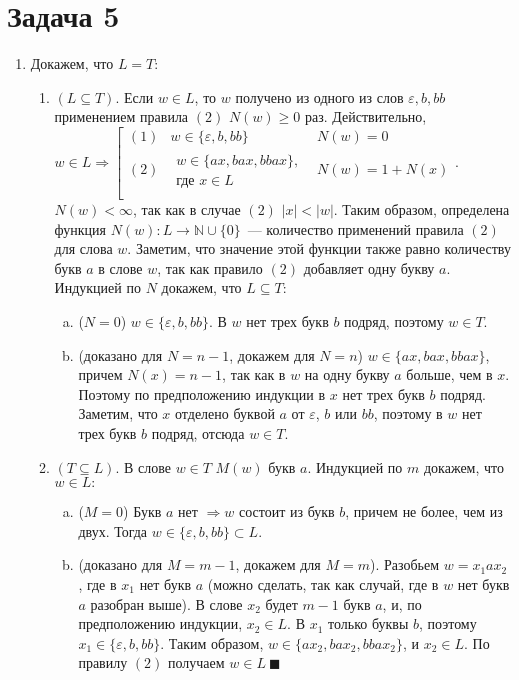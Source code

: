 \documentclass[a4paper]{article}
\begin{document}
\section*{Задача 5}
\begin{enumerate}[1.]
\item
Докажем, что $L=T$:
\begin{enumerate}[1.]
\item $(L\subseteq T)$. Если $w\in L$, то $w$ получено из одного из слов $\varepsilon,b,bb$ применением правила $(2)$ $N(w)\geqslant 0$ раз. Действительно, $w\in L\Rightarrow
\left[
\begin{array}{lll}
(1) & w\in\{\varepsilon,b,bb\} & N(w)=0\\
(2) & \substack{w\in\{ax,bax,bbax\},\\\text{где } x\in L} & N(w)=1+N(x)\\
\end{array}
\right.
$. $N(w)<\infty$, так как в случае $(2)$ $|x|<|w|$.\newline
Таким образом, определена функция $N(w):L\longrightarrow {\mathbb N}\cup\{0\}$~--- количество применений правила $(2)$ для слова $w$. Заметим, что значение этой функции также равно количеству букв $a$ в слове $w$, так как правило $(2)$ добавляет одну букву $a$. Индукцией по $N$ докажем, что $L\subseteq T$:
\begin{enumerate}[a.]
\item ($N=0$) $w\in \{\varepsilon,b,bb\}$. В $w$ нет трех букв $b$ подряд, поэтому $w\in T$.
\item (доказано для $N=n-1$, докажем для $N=n$) $w\in \{ax,bax,bbax\}$, причем $N(x)=n-1$, так как в $w$ на одну букву $a$ больше, чем в $x$. Поэтому по предположению индукции в $x$ нет трех букв $b$ подряд. Заметим, что $x$ отделено буквой $a$ от $\varepsilon$, $b$ или $bb$, поэтому в $w$ нет трех букв $b$ подряд, отсюда $w\in T$.
\end{enumerate}
\item $(T\subseteq L)$. В слове $w\in T$ $M(w)$ букв $a$. Индукцией по $m$ докажем, что $w\in L:$
\begin{enumerate}[a.]
\item ($M=0$) Букв $a$ нет $\Rightarrow w$ состоит из букв $b$, причем не более, чем из двух. Тогда $w\in \{\varepsilon,b,bb\}\subset L$.
\item (доказано для $M=m-1$, докажем для $M=m$). Разобьем $w=x_1ax_2$, где в $x_1$ нет букв $a$ (можно сделать, так как случай, где в $w$ нет букв $a$ разобран выше). В слове $x_2$ будет $m-1$ букв $a$, и, по предположению индукции, $x_2\in L$. В $x_1$ только буквы $b$, поэтому $x_1\in\{\varepsilon,b,bb\}$. Таким образом, $w\in\{ax_2,bax_2,bbax_2\}$, и $x_2\in L$. По правилу $(2)$ получаем $w\in L~\blacksquare$

\end{enumerate}
\end{enumerate}
\end{enumerate}
\end{document}
